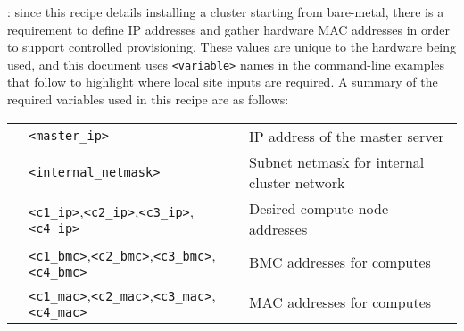 : since this recipe details installing a cluster
starting from bare-metal, there is a requirement to define IP addresses and gather
hardware MAC addresses in order to support controlled provisioning. These values
are unique to the hardware being used, and this document uses \texttt{<variable>}
names in the command-line examples that follow to highlight where local site
inputs are required. A summary of the required variables used in this recipe
are as follows: \\

\vspace*{0.2cm}
\begin{tabular}{@{}>{\textbullet}cll@{}}
& \texttt{<master\_ip>} & IP address of the master server \\
& \texttt{<internal\_netmask>} & Subnet netmask for internal cluster network \\
& \texttt{<c1\_ip>},\texttt{<c2\_ip>},\texttt{<c3\_ip>},\texttt{<c4\_ip>}
& Desired compute node addresses \\
& \texttt{<c1\_bmc>},\texttt{<c2\_bmc>},\texttt{<c3\_bmc>},\texttt{<c4\_bmc>}
& BMC addresses for computes \\
& \texttt{<c1\_mac>},\texttt{<c2\_mac>},\texttt{<c3\_mac>},\texttt{<c4\_mac>}
& MAC addresses for computes \\
\end{tabular}
